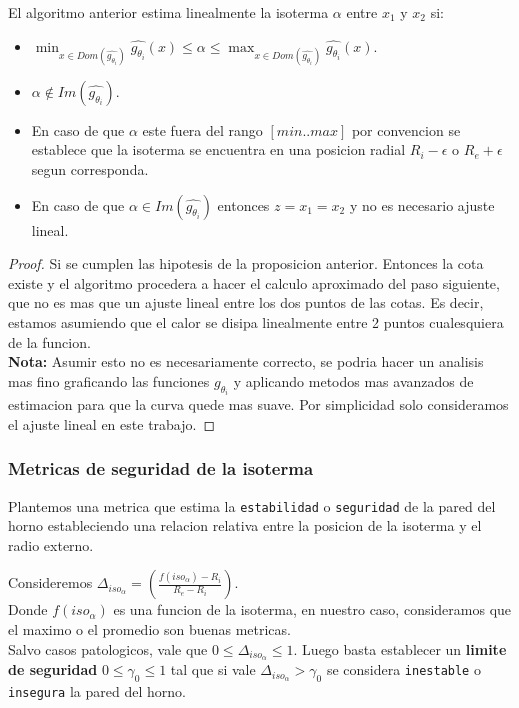 \begin{proposition}
    El algoritmo anterior estima linealmente la isoterma $\alpha$ entre $x_1$ y $x_2$ si:
    \begin{itemize}
        \item $\displaystyle\min_{x \in Dom(\hat{g_{\theta_i}})}{\hat{g_{\theta_i}}(x)} \leq \alpha \leq \displaystyle\max_{x \in Dom(\hat{g_{\theta_i}})}{\hat{g_{\theta_i}}(x)}$.
        \item $\alpha \notin Im(\hat{g_{\theta_i}})$.
    \end{itemize}
    \begin{itemize}
        \item En caso de que $\alpha$ este fuera del rango $[min..max]$ por convencion se establece que la isoterma se encuentra en una posicion radial $R_i - \epsilon$ o $R_e + \epsilon$ segun corresponda.
        \item En caso de que $\alpha \in Im(\hat{g_{\theta_i}})$ entonces $z = x_1 = x_2$ y no es necesario ajuste lineal.
    \end{itemize}
\end{proposition}
\begin{proof}
    Si se cumplen las hipotesis de la proposicion anterior. Entonces la cota existe y el algoritmo  procedera a hacer el calculo aproximado del paso siguiente, que no es mas que un ajuste lineal entre los dos puntos de las cotas. Es decir, estamos asumiendo que el calor se disipa linealmente entre 2 puntos cualesquiera de la funcion.\\
    \vspace{0.3cm}
    \textbf{Nota:} Asumir esto no es necesariamente correcto, se podria hacer un analisis mas fino graficando las funciones $g_{\theta_i}$ y aplicando metodos mas avanzados de estimacion para que la curva quede mas suave. Por simplicidad solo consideramos el ajuste lineal en este trabajo.
\end{proof}

\subsubsection{Metricas de seguridad de la isoterma}
Plantemos una metrica que estima la \texttt{estabilidad} o \texttt{seguridad} de la pared del horno estableciendo una relacion relativa entre la posicion de la isoterma y el radio externo. 
\begin{proposition}
    Consideremos $\Delta_{iso_\alpha} = \left( \frac{f(iso_\alpha) - R_i}{R_e - R_i} \right)$.\\
    Donde $f(iso_\alpha)$ es una funcion de la isoterma, en nuestro caso, consideramos que el maximo o el promedio son buenas metricas.\\
    Salvo casos patologicos, vale que $0 \leq \Delta_{iso_\alpha}\leq 1$. Luego basta establecer un \textbf{limite de seguridad} $0 \leq \gamma_0 \leq 1$ tal que si vale $\Delta_{iso_\alpha} > \gamma_0$ se considera \texttt{inestable} o \texttt{insegura} la pared del horno.
\end{proposition}



